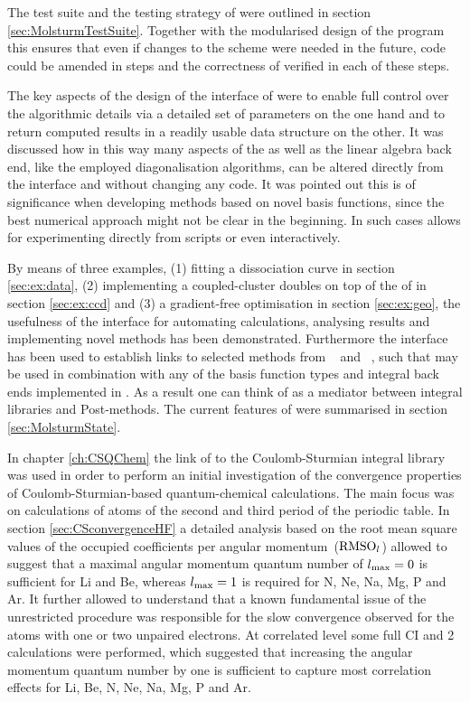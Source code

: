 The test suite and the testing strategy
of \molsturm were outlined in section \ref{sec:MolsturmTestSuite}.
Together with the modularised design of the program
this ensures that even if changes to the \SCF scheme
were needed in the future,
code could be amended in steps
and the correctness of \molsturm verified in each of these steps.

The key aspects of the design of the \python interface of \molsturm
were to enable full control over the algorithmic details
via a detailed set of parameters on the one hand and
to return computed \SCF results in a readily usable data structure on the other.
It was discussed how in this way
many aspects of the \SCF as well as the linear algebra back end,
like the employed diagonalisation algorithms,
can be altered directly from the interface and without changing any code.
It was pointed out this is
of significance when developing methods based on novel basis functions,
since the best numerical approach might not be clear in the beginning.
In such cases \molsturm allows for experimenting
directly from \python scripts or even interactively.

By means of three examples,
(1) fitting a  dissociation curve in section \ref{sec:ex:data},
(2) implementing a coupled-cluster doubles on top of
the \SCF of \molsturm in section \ref{sec:ex:ccd} and
(3) a gradient-free optimisation in section \ref{sec:ex:geo},
the usefulness of the \python interface
for automating calculations,
analysing results
and implementing novel methods has been demonstrated.
Furthermore the \python interface has been used to establish
links to selected methods
from \pyscf~\cite{Sun2017} and \adcman~\cite{Wormit2014},
such that may be used in combination with any of the
basis function types and integral back ends implemented in \molsturm.
As a result one can think of \molsturm as a mediator
between integral libraries and Post-\HF methods.
The current features of \molsturm
were summarised in section \ref{sec:MolsturmState}.


In chapter \ref{ch:CSQChem} the link of \molsturm
to the Coulomb-Sturmian integral library \sturmint was used
in order to perform an initial investigation
of the convergence properties of Coulomb-Sturmian-based
quantum-chemical calculations.
The main focus was on \HF calculations of atoms
of the second and third period of the periodic table.
In section \ref{sec:CSconvergenceHF}
a detailed analysis based on the root mean square values
of the occupied coefficients per angular momentum~($\text{RMSO}_l$)
allowed to suggest that
a maximal angular momentum quantum number of $l_\text{max} = 0$
is sufficient for Li and Be,
whereas $l_\text{max} = 1$ is required for N, Ne, Na, Mg, P and Ar.
It further allowed to understand that a known fundamental issue of
the unrestricted \HF procedure
was responsible for the slow convergence observed for the
atoms with one or two unpaired electrons.
At correlated level some full CI and {\MP}2 calculations
were performed,
which suggested that increasing the angular momentum quantum number
by one is sufficient to capture
most correlation effects for Li, Be, N, Ne, Na, Mg, P and Ar.

